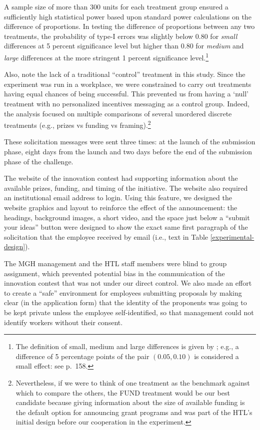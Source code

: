 \documentclass[12pt, titlepage]{article}
\begin{document}


A sample size of more than 300 units for each treatment group ensured a
sufficiently high statistical power based upon standard power
calculations on the difference of proportions. In testing the difference
of proportions between any two treatments, the probability of type-I
errors was slightly below \(0.80\) for \emph{small} differences at 5
percent significance level but higher than \(0.80\) for \emph{medium}
and \emph{large} differences at the more stringent 1 percent
significance level.\footnote{The definition of small, medium and large
  differences is given by \citet{cohen1992power}; e.g., a difference of
  5 percentage points of the pair \((0.05, 0.10)\) is considered a small
  effect: see \citet{cohen1992power} p.~158.}

Also, note the lack of a traditional ``control'' treatment in this
study. Since the experiment was run in a workplace, we were constrained
to carry out treatments having equal chances of being successful. This
prevented us from having a `null' treatment with no personalized
incentives messaging as a control group. Indeed, the analysis focused on
multiple comparisons of several unordered discrete treatments (e.g.,
prizes vs funding vs framing).\footnote{Nevertheless, if we were to
  think of one treatment as the benchmark against which to compare the
  others, the FUND treatment would be our best candidate because giving
  information about the size of available funding is the default option
  for announcing grant programs and was part of the HTL's initial design
  before our cooperation in the experiment.}

These solicitation messages were sent three times: at the launch of the
submission phase, eight days from the launch and two days before the end
of the submission phase of the challenge.

The website of the innovation contest had supporting information about
the available prizes, funding, and timing of the initiative. The website
also required an institutional email address to login. Using this
feature, we designed the website graphics and layout to reinforce the
effect of the announcement: the headings, background images, a short
video, and the space just below a ``submit your ideas'' button were
designed to show the exact same first paragraph of the solicitation that
the employee received by email (i.e., text in Table
\ref{experimental-design}).

The MGH management and the HTL staff members were blind to group
assignment, which prevented potential bias in the communication of the
innovation contest that was not under our direct control. We also made
an effort to create a ``safe'' environment for employees submitting
proposals by making clear (in the application form) that the identity of
the proponents was going to be kept private unless the employee
self-identified, so that management could not identify workers without
their consent.
\end{document}

